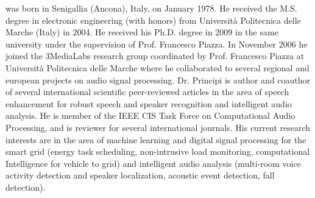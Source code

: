 \documentclass[review]{elsarticle}
\begin{document}
 was born in Senigallia (Ancona), Italy, on January 1978. He received the M.S. degree in electronic engineering (with honors) from Universit\`a Politecnica delle Marche (Italy) in 2004. He received his Ph.D. degree in 2009 in the same university under the supervision of Prof. Francesco Piazza. In November 2006 he joined the 3MediaLabs research group coordinated by Prof. Francesco Piazza at Universit\`a Politecnica delle Marche where he collaborated to several regional and european projects on audio signal processing. Dr. Principi is author and coauthor of several international scientific peer-reviewed articles in the area of speech enhancement for robust speech and speaker recognition and intelligent audio analysis. He is member of the IEEE CIS Task Force on Computational Audio Processing, and is reviewer for several international journals. His current research interests are in the area of machine learning and digital signal processing for the smart grid (energy task scheduling, non-intrusive load monitoring, computational Intelligence for vehicle to grid) and intelligent audio analysis (multi-room voice activity detection and speaker localization, acoustic event detection, fall detection).
\vspace{1cm}
\end{document}
